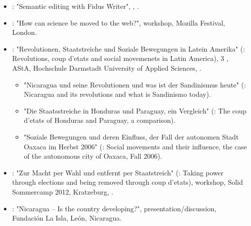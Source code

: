 \begin{itemize}
\item {}: "Semantic editing with Fidus Writer", , \Germany.

\item {}: "How can science be moved to the web?", workshop, Mozilla Festival, London.

\item {}: "Revolutionen, Staatstreiche und Soziale Bewegungen in Latein Amerika" (\english: Revolutions, coup d'etats and social movemenets in Latin America), 3 \days \series, AStA, Hochschule Darmstadt University of Applied Sciences, \Germany.
	\begin{itemize}
	\item "Nicaragua und seine Revolutionen und was ist der Sandinismus heute" (\english: Nicaragua and its revolutions and what is Sandinismo today).
	\item "Die Staatsstreiche in Honduras und Paraguay, ein Vergleich" (\english: The coup d'etats of Honduras and Paraguay, a comparison).
	\item "Soziale Bewegungen und deren Einfluss, der Fall der autonomen Stadt Oaxaca im Herbst 2006" (\english: Social movements and their influence, the case of the autonomous city of Oaxaca, Fall 2006).
	\end{itemize}


\item {}: "Zur Macht per Wahl und entfernt per Staatstreich" (\english: Taking power through elections and being removed through coup d'etats), workshop, Solid Sommercamp 2012, Kratzeburg, \Germany.

\item {}: "Nicaragua – Is the country developing?", presentation/discussion, Fundación La Isla, León, Nicaragua.


\end{itemize}
